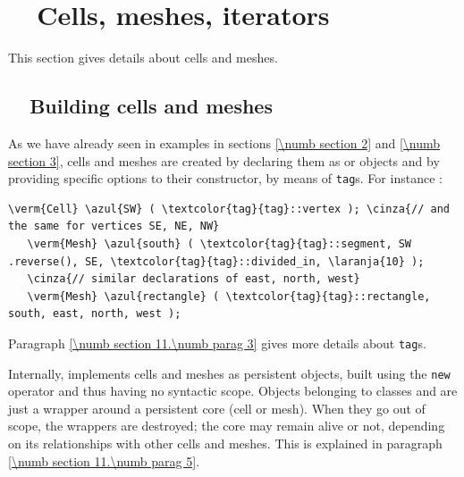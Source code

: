 
\chapter{~~Cells, meshes, iterators}\label{\numb section 9}


This section gives details about cells and meshes.

\section{~~Building cells and meshes}\label{\numb section 9.\numb parag 1}

As we have already seen in examples in sections \ref{\numb section 2} and \ref{\numb section 3},
cells and meshes are created by declaring them as {\small\tt {}} or
{\small\tt {}} objects
and by providing specific options to their constructor, by means of {\small\tt\textcolor{tag}{tag}}s.
For instance :

\begin{Verbatim}[commandchars=\\\{\},formatcom=\small\tt,
   baselinestretch=0.94,framesep=2mm                      ]
   \verm{Cell} \azul{SW} ( \textcolor{tag}{tag}::vertex ); \cinza{// and the same for vertices SE, NE, NW}
   \verm{Mesh} \azul{south} ( \textcolor{tag}{tag}::segment, SW .reverse(), SE, \textcolor{tag}{tag}::divided_in, \laranja{10} );
   \cinza{// similar declarations of east, north, west}
   \verm{Mesh} \azul{rectangle} ( \textcolor{tag}{tag}::rectangle, south, east, north, west );
\end{Verbatim}

Paragraph \ref{\numb section 11.\numb parag 3} gives more details about {\small\tt\textcolor{tag}{tag}}s.

Internally, {\maniFEM} implements cells and meshes as persistent objects, built
using the {\small\tt new} operator and thus having no syntactic scope.
Objects belonging to classes {\small\tt {}} and {\small\tt {}} are just a wrapper
around a persistent core (cell or mesh).
When they go out of scope, the wrappers are destroyed; the core may remain alive or not,
depending on its relationships with other cells and meshes.
This is explained in paragraph \ref{\numb section 11.\numb parag 5}.

